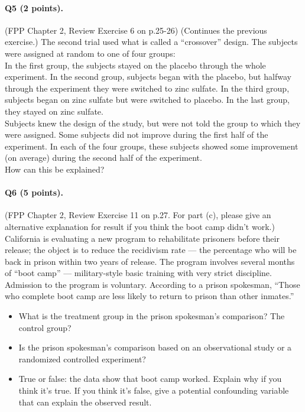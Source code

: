 \documentclass[11pt]{article}
\begin{document}
\paragraph{Q5 (2 points).} (FPP Chapter 2, Review Exercise 6 on p.25-26) (Continues the previous exercise.) The second trial used what is called a “crossover” design. The subjects were assigned at random to one of four groups:\\
In the first group, the subjects stayed on the placebo through the whole experiment.  
In the second group, subjects began with the placebo, but halfway through the experiment they were switched to zinc sulfate. In the third group, subjects began on zinc sulfate but were switched to placebo. In the last group, they stayed on zinc sulfate.\\
Subjects knew the design of the study, but were not told the group to which they were assigned. Some subjects did not improve during the first half of the experiment. In each of the four groups, these subjects showed some improvement (on average) during the second half of the experiment.\\
How can this be explained?

\paragraph{Q6 (5 points).} (FPP Chapter 2, Review Exercise 11 on p.27. For part (c), please give an alternative explanation for result if
you think the boot camp didn’t work.)  California is evaluating a new program to rehabilitate prisoners before their release; the object is to reduce the recidivism rate — the percentage who will be back in prison within two years of release. The program involves several months of “boot camp” — military-style basic training with very strict discipline. Admission to the program is voluntary. According to a prison spokesman, “Those who complete boot camp are less likely to return to prison than other inmates.”

\begin{itemize}
\item What is the treatment group in the prison spokesman’s comparison? The control group?
\item Is the prison spokesman’s comparison based on an observational study or a randomized controlled experiment?
\item True or false: the data show that boot camp worked. Explain why if you think it’s true. If you think it’s false, give a potential confounding variable that can explain the observed result.
\end{itemize}
\end{document}
